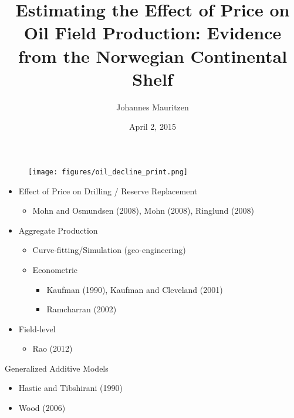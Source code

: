 \documentclass{beamer}
\title{Estimating the Effect of Price on Oil Field Production: Evidence from the Norwegian Continental Shelf}
\author{Johannes Mauritzen}
\institute %
{
 Department of Business and Management Science\\
 NHH Norwegian School of Economics
}
\date{April 2, 2015}
\begin{document}
\begin{frame}[plain]
  \titlepage
\end{frame}

\begin{frame}
	\begin{figure}
		\texttt{[image: figures/oil\_decline\_print.png]}
		\label{oil_decline}
	\end{figure}
\end{frame}

\begin{frame}[plain]
	\begin{itemize}
		\item Effect of Price on Drilling / Reserve Replacement
			\begin{itemize} \item Mohn and Osmundsen (2008), Mohn (2008), Ringlund (2008) \end{itemize}
		 \item Aggregate Production

			\begin{itemize}
				\item Curve-fitting/Simulation (geo-engineering)
				\item Econometric
			
				\begin{itemize}
					\item Kaufman (1990), Kaufman and Cleveland (2001)
					\item Ramcharran (2002)
	 			\end{itemize}		
	 	\end{itemize}
	 	\item Field-level
	 			\begin{itemize}
	 				\item Rao (2012)
	 			\end{itemize}
	\end{itemize}
\end{frame}

\begin{frame}[plain]
	Generalized Additive Models
	\begin{itemize}
	\item  Hastie and Tibshirani (1990) 
	\item  Wood (2006)
	\end {itemize}
\end{frame}
\end{document}
